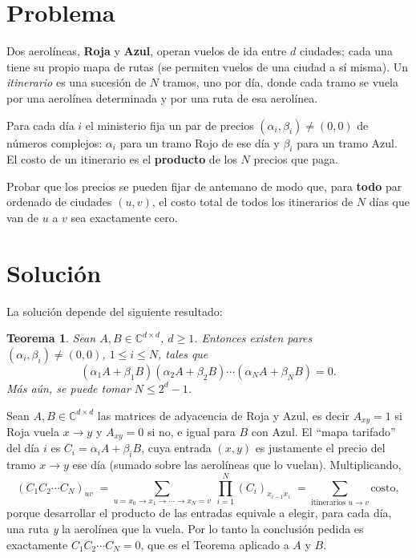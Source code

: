 \documentclass[11pt,a4paper]{amsproc}
\newtheorem*{theorem}{Teorema}
\newcommand{\C}{\mathbb{C}}
\begin{document}
\section*{Problema}

Dos aerolíneas, \textbf{Roja} y \textbf{Azul}, operan vuelos de ida entre $d$ ciudades;
cada una tiene su propio mapa de rutas (se permiten vuelos de una ciudad a sí misma).
Un \emph{itinerario} es una sucesión de $N$ tramos, uno por día, donde cada tramo se vuela
por una aerolínea determinada y por una ruta de esa aerolínea.

Para cada día $i$ el ministerio fija un par de precios $(\alpha_i,\beta_i)\neq(0,0)$ de
números complejos: $\alpha_i$ para un tramo Rojo de ese día y $\beta_i$ para un tramo Azul.
El costo de un itinerario es el \textbf{producto} de los $N$ precios que paga.

Probar que los precios se pueden fijar de antemano de modo que, para \textbf{todo} par
ordenado de ciudades $(u,v)$, el costo total de todos los itinerarios de $N$ días que van
de $u$ a $v$ sea exactamente cero. 

\section*{Solución}

La solución depende del siguiente resultado: 

\begin{theorem}
  Sean $A,B\in \C^{d\times d}$, $d\ge 1$. Entonces existen pares
$(\alpha_i,\beta_i)\neq(0,0)$, $1\le i\le N$, tales que
\[
  (\alpha_1A+\beta_1B)(\alpha_2A+\beta_2B)\cdots(\alpha_NA+\beta_NB)=0 .
\]
Más aún, se puede tomar $N\le 2^{d}-1$.
\end{theorem}

Sean $A,B\in\C^{d\times d}$ las matrices de adyacencia de Roja y Azul, es decir
$A_{xy}=1$ si Roja vuela $x\to y$ y $A_{xy}=0$ si no, e igual para $B$ con Azul.
El ``mapa tarifado'' del día $i$ es $C_i=\alpha_iA+\beta_iB$, cuya entrada $(x,y)$ es
justamente el precio del tramo $x\to y$ ese día (sumado sobre las aerolíneas que lo vuelan).
Multiplicando,
\[
  (C_1C_2\cdots C_N)_{uv}
  \;=\!\!\sum_{u=x_0\to x_1\to\cdots\to x_N=v}\ \prod_{i=1}^N (C_i)_{x_{i-1}x_i}
  \;=\!\!\sum_{\text{itinerarios } u\to v}\!\!\text{costo},
\]
porque desarrollar el producto de las entradas equivale a elegir, para cada día, una ruta
\emph{y} la aerolínea que la vuela. Por lo tanto la conclusión pedida es exactamente
$C_1C_2\cdots C_N=0$, que es el Teorema aplicado a $A$ y $B$. \qedhere
\end{document}
